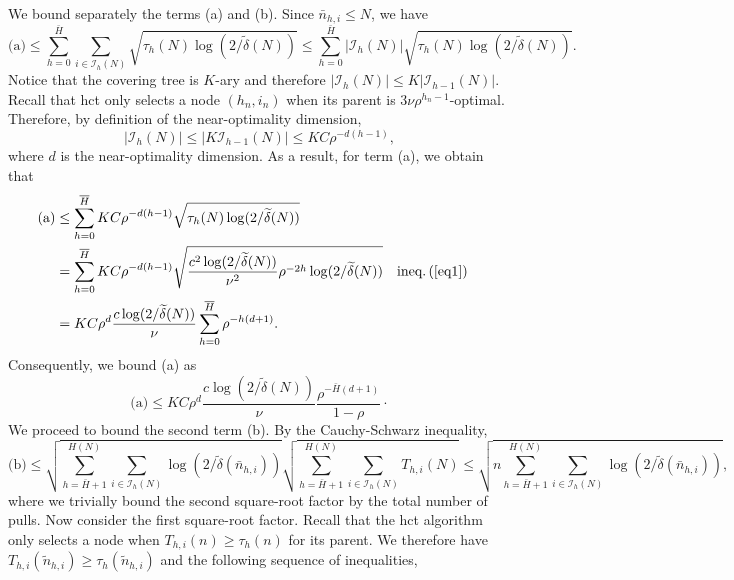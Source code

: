 We bound separately the terms (a) and (b). Since $\bar{n}_{h,i}\leq N$, we have
\begin{equation*} %
\text{(a)} \leq \sum_{h=0}^{\bar{H}}\sum_{i\in\mathcal{I}_h(N)} \sqrt{\tau_h(N)\log(2/\tilde{\delta}(N))} \leq \sum_{h=0}^{\bar{H}}|\mathcal{I}_h(N)| \sqrt{\tau_h(N)\log(2/\tilde{\delta}(N))}.
\end{equation*}
Notice that the covering tree is $K$-ary and therefore $|\mathcal{I}_h(N)| \leq K|\mathcal{I}_{h-1}(N)|$. Recall that \gls{hct} only selects a node $(h_n,i_n)$ when its parent is $3\nu\rho^{h_n-1}$-optimal. Therefore, by definition of the near-optimality dimension,
\begin{equation*} %
|\mathcal{I}_h(N)| \leq| K\mathcal{I}_{h-1}(N)| \leq KC\rho^{-d(h-1)},
\end{equation*}
where $d$ is the near-optimality dimension. As a result, for term (a), we obtain that
\begin{align*}
    \text{(a)} & \leq \sum_{h=0}^{\bar{H}} KC\rho^{-d(h-1)} \sqrt{\tau_h(N)\log(2/\tilde{\delta}(N))} \\
               & = \sum_{h=0}^{\bar{H}} KC\rho^{-d(h-1)} \sqrt{\frac{c^2\log(2/\tilde{\delta}(N))}{\nu^2}\rho^{-2h}\log(2/\tilde{\delta}(N))} && \text{ineq.\,(\ref{eq1})} \\
               & = KC\rho^d \frac{c\log(2/\tilde{\delta}(N))}{\nu} \sum_{h=0}^{\bar{H}} \rho^{-h(d+1)}.
\end{align*}
Consequently, we  bound (a) as
\begin{equation} \label{eq17}
    \text{(a)} \leq KC\rho^d \frac{c\log\left(2/\tilde{\delta}(N)\right)}{\nu} \frac{\rho^{-\bar{H}(d+1)}}{1-\rho}\cdot
\end{equation}
We proceed to bound the second term (b). By the Cauchy-Schwarz inequality,
\begin{equation*} %
\text{(b)} \leq \sqrt{\sum_{h=\bar{H}+1}^{H(N)}\sum_{i\in\mathcal{I}_h(N)} \log\left(2/\tilde{\delta}\left(\bar{n}_{h,i}\right)\right)} \sqrt{\sum_{h=\bar{H}+1}^{H(N)}\sum_{i\in\mathcal{I}_h(N)} T_{h,i}(N)} \leq \sqrt{n\sum_{h=\bar{H}+1}^{H(N)}\sum_{i\in\mathcal{I}_h(N)} \log\left(2/\tilde{\delta}\left(\bar{n}_{h,i}\right)\right)},
\end{equation*}
where we trivially bound the second square-root factor by the total number of pulls. Now consider the first square-root factor. Recall that the \gls{hct} algorithm only selects a node when $T_{h,i}(n)\geq\tau_h(n)$ for its parent. We therefore have $T_{h,i}(\tilde{n}_{h,i})\geq\tau_h(\tilde{n}_{h,i})$ and the following sequence of inequalities,
